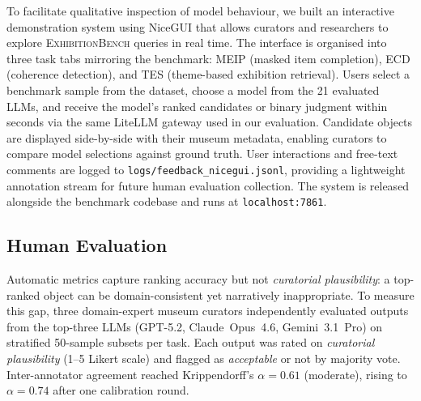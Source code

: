 \documentclass[11pt]{article}
\newcommand{\bench}{\textsc{ExhibitionBench}}
\newcommand{\meip}{\textsc{MEIP}}
\newcommand{\tes}{\textsc{TES}}
\newcommand{\ecd}{\textsc{ECD}}
\begin{document}
To facilitate qualitative inspection of model behaviour,
we built an interactive demonstration system using NiceGUI
that allows curators and researchers to explore \bench{} queries
in real time.
The interface is organised into three task tabs mirroring the benchmark:
\meip{} (masked item completion), \ecd{} (coherence detection),
and \tes{} (theme-based exhibition retrieval).
Users select a benchmark sample from the dataset, choose a model from
the 21 evaluated LLMs, and receive the model's ranked candidates or
binary judgment within seconds via the same LiteLLM gateway used in
our evaluation.
Candidate objects are displayed side-by-side with their museum metadata,
enabling curators to compare model selections against ground truth.
User interactions and free-text comments are logged to
\texttt{logs/feedback\_nicegui.jsonl}, providing a lightweight
annotation stream for future human evaluation collection.
The system is released alongside the benchmark codebase and runs
at \texttt{localhost:7861}.

\subsection{Human Evaluation}
\label{sec:human-eval}

Automatic metrics capture ranking accuracy but not \emph{curatorial plausibility}:
a top-ranked object can be domain-consistent yet narratively inappropriate.
To measure this gap, three domain-expert museum curators independently
evaluated outputs from the top-three LLMs (GPT-5.2, Claude~Opus~4.6,
Gemini~3.1~Pro) on stratified 50-sample subsets per task.
Each output was rated on \emph{curatorial plausibility} (1--5 Likert scale)
and flagged as \emph{acceptable} or not by majority vote.
Inter-annotator agreement reached Krippendorff's $\alpha = 0.61$ (moderate),
rising to $\alpha = 0.74$ after one calibration round.

\begin{table}[!t]
\centering\small
\setlength{\tabcolsep}{4.5pt}
\caption{Human evaluation: mean curatorial plausibility (1--5) and
majority-vote acceptability (\%) per task.
Human upper bound estimated from expert-curated reference selections.
$\alpha = 0.61$ (Krippendorff, before calibration).}
\label{tab:human-eval}
\end{table}
\end{document}
